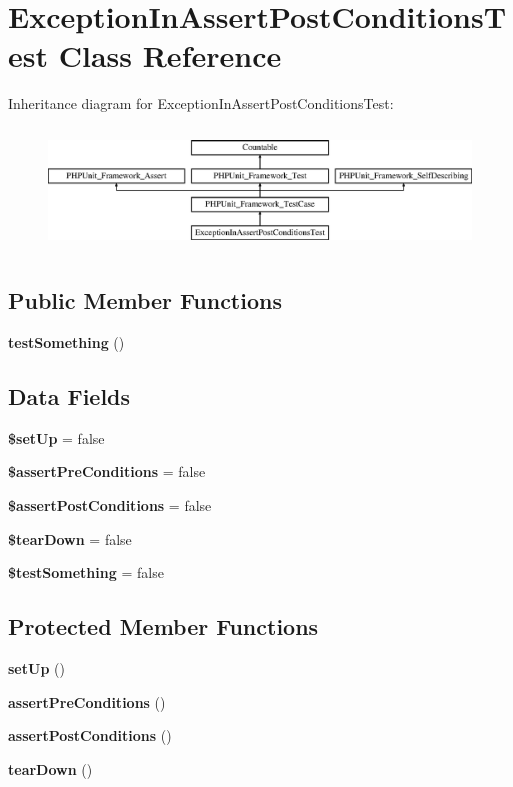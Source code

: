\section{Exception\+In\+Assert\+Post\+Conditions\+Test Class Reference}
\label{class_exception_in_assert_post_conditions_test}
Inheritance diagram for Exception\+In\+Assert\+Post\+Conditions\+Test\+:\begin{figure}[H]
\begin{center}
\leavevmode
\includegraphics[height=3.289281cm]{class_exception_in_assert_post_conditions_test}
\end{center}
\end{figure}
\subsection*{Public Member Functions}
\begin{DoxyCompactItemize}
\item 
{\bf test\+Something} ()
\end{DoxyCompactItemize}
\subsection*{Data Fields}
\begin{DoxyCompactItemize}
\item 
{\bf \$set\+Up} = false
\item 
{\bf \$assert\+Pre\+Conditions} = false
\item 
{\bf \$assert\+Post\+Conditions} = false
\item 
{\bf \$tear\+Down} = false
\item 
{\bf \$test\+Something} = false
\end{DoxyCompactItemize}
\subsection*{Protected Member Functions}
\begin{DoxyCompactItemize}
\item 
{\bf set\+Up} ()
\item 
{\bf assert\+Pre\+Conditions} ()
\item 
{\bf assert\+Post\+Conditions} ()
\item 
{\bf tear\+Down} ()
\end{DoxyCompactItemize}
